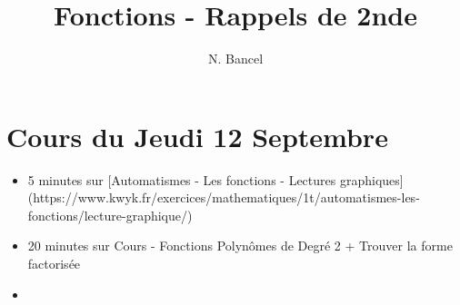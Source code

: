 \documentclass[a4paper,12pt]{article}
\begin{document}
\title{Fonctions - Rappels de 2nde}
\author{N. Bancel}

\maketitle

\section{Cours du Jeudi 12 Septembre}

\begin{itemize}
  \item 5 minutes sur [Automatismes - Les fonctions - Lectures graphiques](https://www.kwyk.fr/exercices/mathematiques/1t/automatismes-les-fonctions/lecture-graphique/)
  \item 20 minutes sur Cours - Fonctions Polynômes de Degré 2 + Trouver la forme factorisée
  \item 
\end{itemize}
\end{document}
